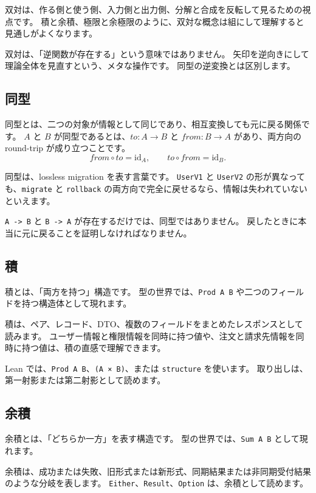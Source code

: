 双対は、作る側と使う側、入力側と出力側、分解と合成を反転して見るための視点です。
積と余積、極限と余極限のように、双対な概念は組にして理解すると見通しがよくなります。

双対は、「逆関数が存在する」という意味ではありません。
矢印を逆向きにして理論全体を見直すという、メタな操作です。
同型の逆変換とは区別します。

\subsection{同型}

同型とは、二つの対象が情報として同じであり、相互変換しても元に戻る関係です。
\(A\) と \(B\) が同型であるとは、\(to : A \to B\) と \(from : B \to A\) があり、両方向の round-trip が成り立つことです。
\[
from \circ to = \mathrm{id}_A, \qquad to \circ from = \mathrm{id}_B.
\]

同型は、lossless migration を表す言葉です。
\texttt{UserV1} と \texttt{UserV2} の形が異なっても、\texttt{migrate} と \texttt{rollback} の両方向で完全に戻せるなら、情報は失われていないといえます。

\texttt{A -> B} と \texttt{B -> A} が存在するだけでは、同型ではありません。
戻したときに本当に元に戻ることを証明しなければなりません。

\subsection{積}

積とは、「両方を持つ」構造です。
型の世界では、\texttt{Prod A B} や二つのフィールドを持つ構造体として現れます。

積は、ペア、レコード、DTO、複数のフィールドをまとめたレスポンスとして読みます。
ユーザー情報と権限情報を同時に持つ値や、注文と請求先情報を同時に持つ値は、積の直感で理解できます。

Lean では、\texttt{Prod A B}、\texttt{(A × B)}、または \texttt{structure} を使います。
取り出しは、第一射影または第二射影として読めます。

\subsection{余積}

余積とは、「どちらか一方」を表す構造です。
型の世界では、\texttt{Sum A B} として現れます。

余積は、成功または失敗、旧形式または新形式、同期結果または非同期受付結果のような分岐を表します。
\texttt{Either}、\texttt{Result}、\texttt{Option} は、余積として読めます。

